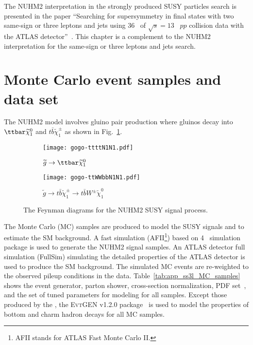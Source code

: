 The NUHM2 interpretation in the strongly produced SUSY particles search is presented in the paper ``Searching for supersymmetry in final states with two same-sign or three leptons and jets using 36~{\ifb} of $\sqrt{s} = 13$~{\TeV} $pp$ collision data with the ATLAS detector''~\cite{Aaboud:2017dmy}.
This chapter is a complement to the NUHM2 interpretation for the same-sign or three leptons and jets search.


\section{Monte Carlo event samples and data set}
\label{app:ss3l_MC_samples}
The NUHM2 model involves gluino pair production where gluinos decay into $\ttbar \widetilde{\chi}^{0}_{1}$ and $t\bar{b} \widetilde{\chi}^{\pm}_{1}$ as shown in Fig.~\ref{fig:app_ss3l_feynman_diagram}.

\begin{figure}[htbp]
    \begin{subfigure}[b]{0.48\textwidth}
        \begin{center}
            \texttt{[image: gogo-ttttN1N1.pdf]}
            \caption{$\widetilde{g} \to \ttbar \widetilde{\chi}^{0}_{1}$}
        \end{center}
    \end{subfigure}
    \begin{subfigure}[b]{0.48\textwidth}
        \begin{center}
            \texttt{[image: gogo-ttWWbbN1N1.pdf]}
            \caption{$\widetilde{g} \to t\bar{b} \widetilde{\chi}^{\pm}_{1} \to t\bar{b} W^{\pm} \widetilde{\chi}^{0}_{1}$}
        \end{center}
    \end{subfigure}
    \caption{The Feynman diagrams for the NUHM2 SUSY signal process.}
    \label{fig:app_ss3l_feynman_diagram}
\end{figure}

The Monte Carlo (MC) samples are produced to model the SUSY signals and to estimate the SM background.
A fast simulation (AFII\footnote{AFII stands for ATLAS Fast Monte Carlo II.}) based on {\GEANT}4~\cite{Agostinelli:2002hh} simulation package is used to generate the NUHM2 signal samples.
An ATLAS detector full simulation (FullSim) simulating the detailed properties of the ATLAS detector is used to produce the SM background.
The simulated MC events are re-weighted to the observed pileup conditions in the data.
Table~\ref{tab:app_ss3l_MC_samples} shows the event generator, parton shower, cross-section normalization, PDF set~\cite{Martin:2009iq}, and the set of tuned parameters for modeling for all samples.
Except those produced by the {\SHERPA}, the \textsc{EvtGEN}\xspace v1.2.0 package~\cite{Lange:2001uf} is used to model the properties of bottom and charm hadron decays for all MC samples.


